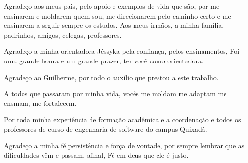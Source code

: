 	Agradeço aos meus pais, pelo apoio e exemplos de vida que são, por me ensinarem e moldarem quem sou, me direcionarem pelo caminho certo e me ensinarem a seguir sempre os estudos.
	Aos meus irmãos, a minha família, padrinhos, amigos, colegas, professores.
	
	Agradeço a minha orientadora Jéssyka pela confiança, pelos ensinamentos, Foi uma grande honra e um grande prazer, ter você como orientadora. 
	
	Agradeço ao Guilherme, por todo o auxílio que prestou a este trabalho.
	
	A todos que passaram por minha vida, vocês me moldam me adaptam me ensinam, me fortalecem.  

    Por toda minha experiência de formação acadêmica e a coordenação e todos os professores do curso de engenharia de software do campus Quixadá.
    
    Agradeço a minha fé persistência e força de vontade, por sempre lembrar que as dificuldades vêm e passam, afinal, Fé em deus que ele é justo.